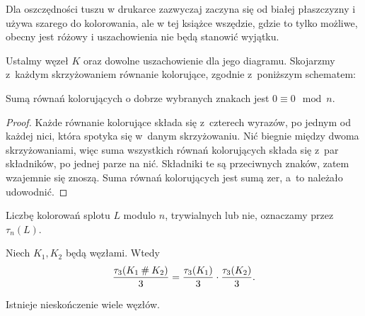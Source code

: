 Dla oszczędności tuszu w drukarce zazwyczaj zaczyna się od białej płaszczyzny i używa szarego do kolorowania, ale w tej książce wszędzie, gdzie to tylko możliwe, obecny jest różowy i uszachowienia nie będą stanowić wyjątku.

Ustalmy węzeł $K$ oraz dowolne uszachowienie dla jego diagramu.
Skojarzmy z~każdym skrzyżowaniem równanie kolorujące, zgodnie z~poniższym schematem:

\begin{proposition}
\label{prp:colouring_sum_zero}%
    Sumą równań kolorujących o dobrze wybranych znakach jest $0 \equiv 0 \mod n$.
\end{proposition}

\begin{proof}
    Każde równanie kolorujące składa się z~czterech wyrazów, po jednym od każdej nici, która spotyka się w~danym skrzyżowaniu.
    Nić biegnie między dwoma skrzyżowaniami, więc suma wszystkich równań kolorujących składa się z~par składników, po jednej parze na nić.
    Składniki te są przeciwnych znaków, zatem wzajemnie się znoszą.
    Suma równań kolorujących jest sumą zer, a~to należało udowodnić.
\end{proof}

Liczbę kolorowań splotu $L$ modulo $n$, trywialnych lub nie, oznaczamy przez $\tau_n(L)$.

\begin{proposition}
    Niech $K_1, K_2$ będą węzłami.
    Wtedy 
    \begin{equation}
        \frac{\tau_3(K_1 \mathbin{\#} K_2)}{3} = \frac{\tau_3(K_1)}{3} \cdot \frac{\tau_3(K_2)}{3}.
    \end{equation}
\end{proposition}

\begin{corollary}
    Istnieje nieskończenie wiele węzłów.
\end{corollary}

